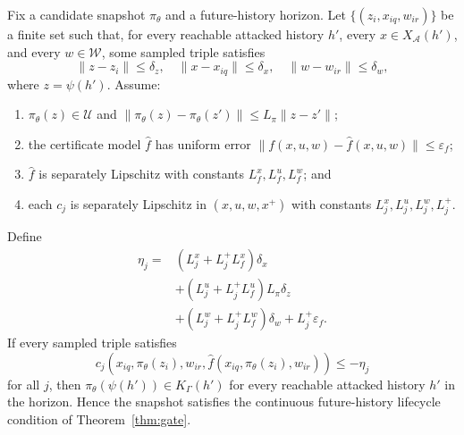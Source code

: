 \begin{theorem}
\label{thm:finite-lift}
Fix a candidate snapshot $\pi_\theta$ and a future-history horizon.  Let
$\{(z_i,x_{iq},w_{ir})\}$ be a finite set such that, for every reachable
attacked history $h'$, every $x\in X_{\mathcal A}(h')$, and every
$w\in\mathcal W$, some sampled triple satisfies
\begin{equation}
\|z-z_i\|\le\delta_z,\quad
\|x-x_{iq}\|\le\delta_x,\quad
\|w-w_{ir}\|\le\delta_w,
\label{eq:joint-cover}
\end{equation}
where $z=\psi(h')$.  Assume:

\begin{enumerate}
    \item $\pi_\theta(z)\in\mathcal U$ and
    $\|\pi_\theta(z)-\pi_\theta(z')\|\le L_\pi\|z-z'\|$;
    \item the certificate model $\widehat f$ has uniform error
    $\|f(x,u,w)-\widehat f(x,u,w)\|\le\varepsilon_f$;
    \item $\widehat f$ is separately Lipschitz with constants
    $L_f^x,L_f^u,L_f^w$; and
    \item each $c_j$ is separately Lipschitz in
    $(x,u,w,x^+)$ with constants
    $L_j^x,L_j^u,L_j^w,L_j^+$.
\end{enumerate}

Define
\begin{equation}
\begin{split}
\eta_j={}&(L_j^x+L_j^+L_f^x)\delta_x\\
&+(L_j^u+L_j^+L_f^u)L_\pi\delta_z\\
&+(L_j^w+L_j^+L_f^w)\delta_w+L_j^+\varepsilon_f .
\end{split}
\label{eq:lift-margin}
\end{equation}
If every sampled triple satisfies
\begin{equation}
c_j\!\left(x_{iq},\pi_\theta(z_i),w_{ir},
\widehat f(x_{iq},\pi_\theta(z_i),w_{ir})\right)
\le-\eta_j
\label{eq:tightened-obligation}
\end{equation}
for all $j$, then $\pi_\theta(\psi(h'))\in K_\Gamma(h')$ for every reachable
attacked history $h'$ in the horizon.  Hence the snapshot satisfies the
continuous future-history lifecycle condition of
Theorem~\ref{thm:gate}.
\end{theorem}

